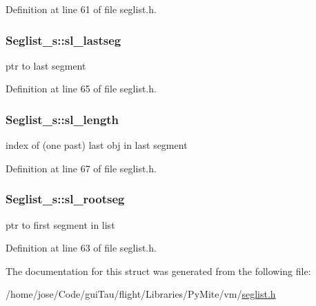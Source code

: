 Definition at line 61 of file seglist.\-h.

\hypertarget{struct_seglist__s_a88b2cd37360813049df23bc0e7db51d1}{
\subsubsection[{sl\-\_\-lastseg}]{ Seglist\-\_\-s\-::sl\-\_\-lastseg}}\label{struct_seglist__s_a88b2cd37360813049df23bc0e7db51d1}
ptr to last segment 

Definition at line 65 of file seglist.\-h.

\hypertarget{struct_seglist__s_a8b7bb21187d3d23e12a68712f388dfd8}{
\subsubsection[{sl\-\_\-length}]{ Seglist\-\_\-s\-::sl\-\_\-length}}\label{struct_seglist__s_a8b7bb21187d3d23e12a68712f388dfd8}
index of (one past) last obj in last segment 

Definition at line 67 of file seglist.\-h.

\hypertarget{struct_seglist__s_a529a3a7582171652fa4b604aee594b3a}{
\subsubsection[{sl\-\_\-rootseg}]{ Seglist\-\_\-s\-::sl\-\_\-rootseg}}\label{struct_seglist__s_a529a3a7582171652fa4b604aee594b3a}
ptr to first segment in list 

Definition at line 63 of file seglist.\-h.



The documentation for this struct was generated from the following file\-:\begin{DoxyCompactItemize}
\item 
/home/jose/\-Code/gui\-Tau/flight/\-Libraries/\-Py\-Mite/vm/\hyperlink{seglist_8h}{seglist.\-h}\end{DoxyCompactItemize}
